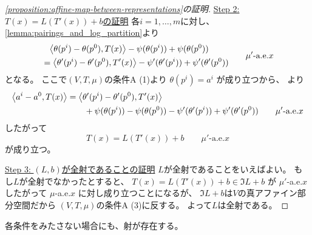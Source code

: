 \documentclass[report]{jlreq}
\begin{document}
\begin{proof}[\cref{proposition:affine-map-between-representations}の証明]
    \uline{Step 2: $T(x) = L(T'(x)) + b$の証明} \quad
    各$i = 1, \dots, m$に対し、
    \cref{lemma:pairings_and_log_partition}より
    \begin{equation}
        \begin{alignedat}{1}
            &\phantom{=}
                \myangle{\theta(p^i) - \theta(p^0)}{T(x)}
                - \psi(\theta(p^i))
                + \psi(\theta(p^0))
                \\
            &=
                \myangle{\theta'(p^i) - \theta'(p^0)}{T'(x)}
                - \psi'(\theta'(p^i))
                + \psi'(\theta'(p^0))
        \end{alignedat}
        \qquad
        \text{$\mu'$-a.e.$x$}
        \locallabel{eq:1}
    \end{equation}
    となる。
    ここで$(V, T, \mu)$の条件A (1)より
    $\theta(p^i) = a^i$
    が成り立つから、
    より
    \begin{equation}
        \begin{alignedat}{1}
            \left\langle{a^i - a^0},{T(x)}\right\rangle
                &=
                    \left\langle{\theta'(p^i) - \theta'(p^0)},{T'(x)}\right\rangle
                    \\
                &\qquad
                    + \psi(\theta(p^i))
                    - \psi(\theta(p^0))
                    - \psi'(\theta'(p^i))
                    + \psi'(\theta'(p^0))
                    \qquad
                    \text{$\mu'$-a.e.$x$}
        \end{alignedat}
    \end{equation}
    したがって
    \begin{equation}
        T(x) = L(T'(x)) + b
            \qquad
            \text{$\mu'$-a.e.$x$}
    \end{equation}
    が成り立つ。

    \uline{Step 3: $(L, b)$が全射であることの証明} \quad
    $L$が全射であることをいえばよい。
    もし$L$が全射でなかったとすると、
    $T(x) = L(T'(x)) + b \in \Im L + b$
    が
    $\mu'$-a.e.$x$
    したがって
    $\mu$-a.e.$x$
    に対し成り立つことになるが、
    $\Im L + b$は$V$の真アファイン部分空間だから
    $(V, T, \mu)$の条件A (3)に反する。
    よって$L$は全射である。
\end{proof}

各条件をみたさない場合にも、射が存在する。

\end{document}
